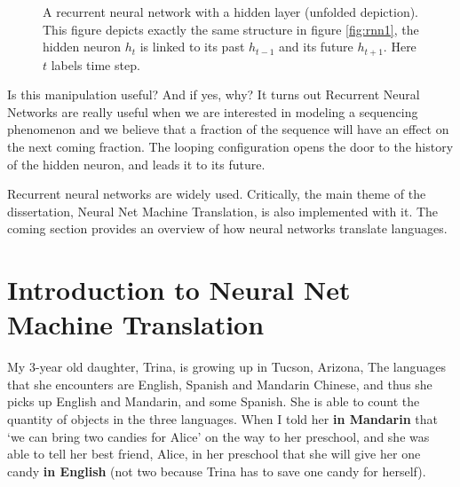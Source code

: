 \begin{figure}
\caption{A recurrent neural network with a hidden layer (unfolded depiction). This figure depicts exactly the same structure in figure \ref{fig:rnn1}, the hidden neuron $h_{t}$ is linked to its past $h_{t-1}$ and its future $h_{t+1}$. Here $t$ labels time step.}
\centering
{}
\end{figure}
\newpage
Is this manipulation useful? And if yes, why? It turns out Recurrent Neural Networks are really useful when we are interested in modeling a sequencing phenomenon and we believe that a fraction of the sequence will have an effect on the next coming fraction. The looping configuration opens the door to the history of the hidden neuron, and leads it to its future. 

Recurrent neural networks are widely used. Critically, the main theme of the dissertation, Neural Net Machine Translation, is also implemented with it. The coming section provides an overview of how neural networks translate languages. 

\section{Introduction to Neural Net Machine Translation}

My 3-year old daughter, Trina, is growing up in Tucson, Arizona, The languages that she encounters are English, Spanish and Mandarin Chinese, and thus she picks up English and Mandarin, and some Spanish. She is able to count the quantity of objects in the three languages. When I told her \textbf{in  Mandarin} that `we can bring two candies for Alice' on the way to her preschool, and she was able to tell her best friend, Alice, in her preschool that she will give her one candy \textbf{in English} (not two because Trina has to save one candy for herself).        

